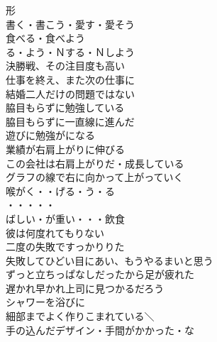 \begin{multicols}{2}
形\\
書く・書こう・愛す・愛そう\\
食べる・食べよう\\
る・よう・Ｎする・Ｎしよう\\

決勝戦、その注目度も高い\\
仕事を終え、また次の仕事に\\
結婚二人だけの問題ではない\\

脇目もらずに勉強している\\
脇目もらずに一直線に進んだ\\
遊びに勉強がになる\\

業績が右肩上がりに伸びる\\
この会社は右肩上がりだ・成長している\\
グラフの線で右に向かって上がっていく\\

喉がく・・げる・う・る\\
・・・・・\\
ばしい・が重い・・・飲食\\

彼は何度れてもりない\\
二度の失敗ですっかりりた\\
失敗してひどい目にあい、もうやるまいと思う\\

ずっと立ちっぱなしだったから足が疲れた\\
遅かれ早かれ上司に見つかるだろう\\
シャワーを浴びに\\
細部までよく作りこまれている＼\\
手の込んだデザイン・手間がかかった・な\\

\end{multicols}

